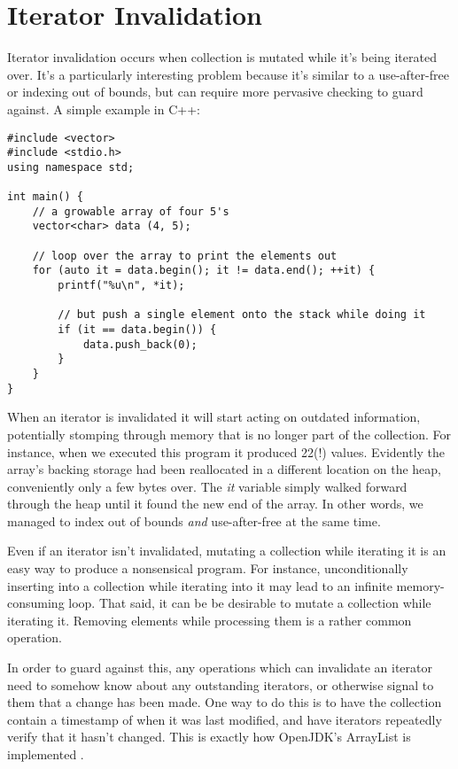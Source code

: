 \section{Iterator Invalidation}

Iterator invalidation occurs when collection is mutated while it's being iterated
over. It's a particularly interesting problem because it's similar to a
use-after-free or indexing out of bounds, but can require more pervasive checking
to guard against. A simple example in C++:

\begin{verbatim}
#include <vector>
#include <stdio.h>
using namespace std;

int main() {
    // a growable array of four 5's
    vector<char> data (4, 5);

    // loop over the array to print the elements out
    for (auto it = data.begin(); it != data.end(); ++it) {
        printf("%u\n", *it);

        // but push a single element onto the stack while doing it
        if (it == data.begin()) {
            data.push_back(0);
        }
    }
}
\end{verbatim}

When an iterator is invalidated it will start acting on
outdated information, potentially stomping through memory that is no longer
part of the collection. For instance, when we executed this program it produced
22(!) values. Evidently the array's backing storage had been reallocated
in a different location on the heap, conveniently only a few bytes over. The \emph{it}
variable simply walked forward through the heap until it found the new end of
the array. In other words, we managed to index out of bounds \emph{and} use-after-free
at the same time.

Even if an iterator isn't invalidated, mutating a collection
while iterating it is an easy way to produce a nonsensical program. For instance,
unconditionally inserting into a collection while iterating into it may lead
to an infinite memory-consuming loop. That said, it can be be desirable to
mutate a collection while iterating it. Removing elements while processing them
is a rather common operation.

In order to guard against this, any operations which can invalidate an iterator
need to somehow know about any outstanding iterators, or otherwise signal to
them that a change has been made. One way to do this is to have the
collection contain a timestamp of when it was last modified, and have iterators
repeatedly verify that it hasn't changed. This is exactly how OpenJDK's ArrayList is
implemented \cite{jdkiter}.

